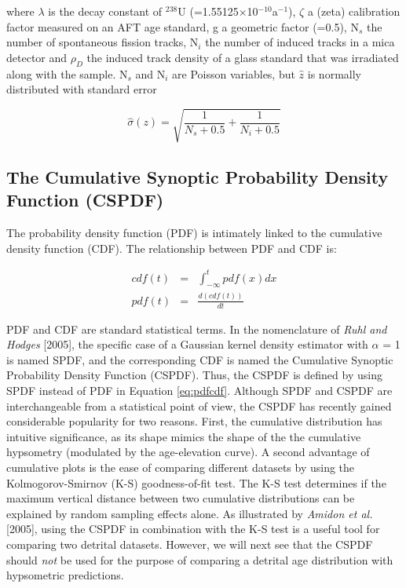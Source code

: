 \documentclass[12pt,twoside]{article}
\begin{document}
where    $\lambda$    is    the    decay   constant    of    $^{238}$U
(=1.55125$\times$10$^{-10}$a$^{-1}$),  $\zeta$  a  (zeta)  calibration
factor measured on  an AFT age standard, g  a geometric factor (=0.5),
N$_s$ the  number of spontaneous  fission tracks, N$_i$ the  number of
induced  tracks in  a mica  detector  and $\rho_D$  the induced  track
density of a glass standard that was irradiated along with the sample.
N$_s$  and N$_i$  are  Poisson variables,  but  $\hat{z}$ is  normally
distributed with standard error

\begin{equation}
  \label{eq:sez}
  \hat{\sigma}(z) = \sqrt{\frac{1}{N_s+0.5} + \frac{1}{N_i+0.5}}
\end{equation}

\subsection{The Cumulative Synoptic Probability Density Function (CSPDF)}

The  probability density function  (PDF) is  intimately linked  to the
cumulative density  function (CDF).  The  relationship between PDF
and CDF is:

\begin{eqnarray}
  \label{eq:pdfcdf}
  cdf(t) & = & \int_{-\infty}^t pdf(x) dx\\
  pdf(t) & = & \frac{d(cdf(t))}{dt}
\end{eqnarray}

PDF and  CDF are standard  statistical terms.  In the  nomenclature of
{\it Ruhl and  Hodges} [2005], the specific case  of a Gaussian kernel
density  estimator  with   $\alpha$  =  1  is  named   SPDF,  and  the
corresponding CDF is named the Cumulative Synoptic Probability Density
Function (CSPDF).  Thus, the CSPDF is defined by using SPDF instead of
PDF  in  Equation  \ref{eq:pdfcdf}.    Although  SPDF  and  CSPDF  are
interchangeable  from  a statistical  point  of  view,  the CSPDF  has
recently gained  considerable popularity for two  reasons.  First, the
cumulative  distribution  has  intuitive  significance, as  its  shape
mimics the  shape of the  the cumulative hypsometry (modulated  by the
age-elevation curve).   A second advantage of cumulative  plots is the
ease of  comparing different datasets by  using the Kolmogorov-Smirnov
(K-S) goodness-of-fit  test.  The K-S  test determines if  the maximum
vertical  distance   between  two  cumulative   distributions  can  be
explained by  random sampling effects  alone.  As illustrated  by {\it
  Amidon et al.}  [2005], using  the CSPDF in combination with the K-S
test is a useful tool for comparing two detrital datasets. However, we
will next see that the CSPDF  should {\it not} be used for the purpose
of comparing a detrital age distribution with hypsometric predictions.
\\
\end{document}
